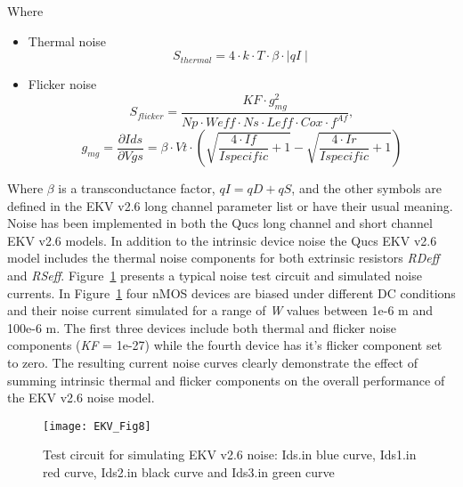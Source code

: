 Where
\begin{itemize}
 \item  Thermal noise
\hspace{20mm}     \begin{equation} 
			S_{thermal}=4 \cdot k \cdot T \cdot \beta \cdot \mid qI \mid
                  \end{equation}  
 \item Flicker noise
\hspace{20mm}     \begin{equation} 
		     S_{flicker} = \dfrac{KF \cdot g_{mg}^{2}}{Np \cdot Weff \cdot Ns \cdot Leff \cdot Cox \cdot f^{Af}},
                  \end{equation}
\hspace{20mm}     \begin{equation} 
		     g_{mg} = \dfrac{\partial Ids}{\partial Vgs} = \beta \cdot Vt \cdot \left( \sqrt{\dfrac{4 \cdot If}{Ispecific}+1}-\sqrt{\dfrac{4 \cdot Ir}{Ispecific}+1} \right) 
                  \end{equation}  
		
\end{itemize}

Where $\beta $ is a transconductance factor, $qI=qD+qS$, and the other
symbols are defined in the EKV v2.6 long channel parameter list or
have their usual meaning. Noise has been implemented in both the Qucs
long channel and short channel EKV v2.6 models. In addition to the
intrinsic device noise the Qucs EKV v2.6 model includes the thermal
noise components for both extrinsic resistors \textit{RDeff} and
\textit{RSeff}. Figure~\ref{fig:EKV8} presents a typical noise test
circuit and simulated noise currents. In Figure~\ref{fig:EKV8} four
nMOS devices are biased under different DC conditions and their noise
current simulated for a range of \textit{W} values between 1e-6 m and
100e-6 m. The first three devices include both thermal and flicker
noise components (\textit{KF} = 1e-27) while the fourth device has
it's flicker component set to zero. The resulting current noise curves
clearly demonstrate the effect of summing intrinsic thermal and
flicker components on the overall performance of the EKV v2.6 noise
model.

\begin{figure}
  \centering
  \texttt{[image: EKV\_Fig8]}
  \caption{Test circuit for simulating EKV v2.6 noise: Ids.in blue curve, Ids1.in red curve, Ids2.in black curve and Ids3.in green curve }
  \label{fig:EKV8}
\end{figure}  


